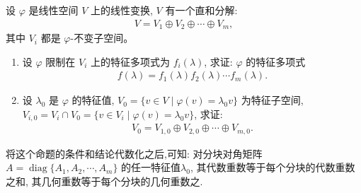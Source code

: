 \documentclass[lang=cn,newtx,10pt,scheme=chinese]{elegantbook}
\begin{document}
\begin{proposition}\label{proposition:线性变换不变子空间直和分解与特征值的关系}
设 $\varphi$ 是线性空间 $V$ 上的线性变换, $V$ 有一个直和分解:
\begin{align*}
V = V_1 \oplus V_2 \oplus \cdots \oplus V_m,
\end{align*}
其中 $V_i$ 都是 $\varphi$-不变子空间。
\begin{enumerate}[(1)]
\item 设 $\varphi$ 限制在 $V_i$ 上的特征多项式为 $f_i(\lambda)$, 求证: $\varphi$ 的特征多项式
\begin{align*}
    f(\lambda) = f_1(\lambda) f_2(\lambda) \cdots f_m(\lambda).
\end{align*}

\item  设 $\lambda_0$ 是 $\varphi$ 的特征值, $V_0 = \{v \in V \mid \varphi(v) = \lambda_0 v\}$ 为特征子空间, $V_{i,0} = V_i \cap V_0 = \{v \in V_i \mid \varphi(v) = \lambda_0 v\}$, 求证:
\begin{align*}
V_0 = V_{1,0} \oplus V_{2,0} \oplus \cdots \oplus V_{m,0}.
\end{align*}
\end{enumerate}
\end{proposition}
\begin{note}
将这个命题的条件和结论代数化之后,可知: 对分块对角矩阵 $A = \operatorname{diag}\{A_1, A_2, \cdots, A_m\}$ 的任一特征值$\lambda_0$, 其代数重数等于每个分块的代数重数之和, 其几何重数等于每个分块的几何重数之.
\end{note}
\end{document}
